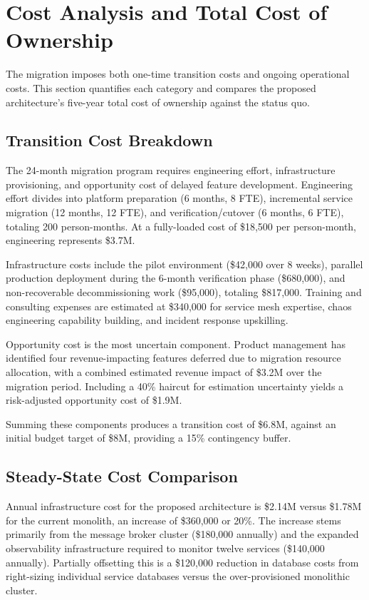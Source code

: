 \section{Cost Analysis and Total Cost of Ownership}

The migration imposes both one-time transition costs and ongoing operational costs. This section quantifies each category and compares the proposed architecture's five-year total cost of ownership against the status quo.

\subsection{Transition Cost Breakdown}

The 24-month migration program requires engineering effort, infrastructure provisioning, and opportunity cost of delayed feature development. Engineering effort divides into platform preparation (6 months, 8 FTE), incremental service migration (12 months, 12 FTE), and verification/cutover (6 months, 6 FTE), totaling 200 person-months. At a fully-loaded cost of \$18,500 per person-month, engineering represents \$3.7M.

Infrastructure costs include the pilot environment (\$42,000 over 8 weeks), parallel production deployment during the 6-month verification phase (\$680,000), and non-recoverable decommissioning work (\$95,000), totaling \$817,000. Training and consulting expenses are estimated at \$340,000 for service mesh expertise, chaos engineering capability building, and incident response upskilling.

Opportunity cost is the most uncertain component. Product management has identified four revenue-impacting features deferred due to migration resource allocation, with a combined estimated revenue impact of \$3.2M over the migration period. Including a 40\% haircut for estimation uncertainty yields a risk-adjusted opportunity cost of \$1.9M.

Summing these components produces a transition cost of \$6.8M, against an initial budget target of \$8M, providing a 15\% contingency buffer.

\subsection{Steady-State Cost Comparison}

Annual infrastructure cost for the proposed architecture is \$2.14M versus \$1.78M for the current monolith, an increase of \$360,000 or 20\%. The increase stems primarily from the message broker cluster (\$180,000 annually) and the expanded observability infrastructure required to monitor twelve services (\$140,000 annually). Partially offsetting this is a \$120,000 reduction in database costs from right-sizing individual service databases versus the over-provisioned monolithic cluster.

